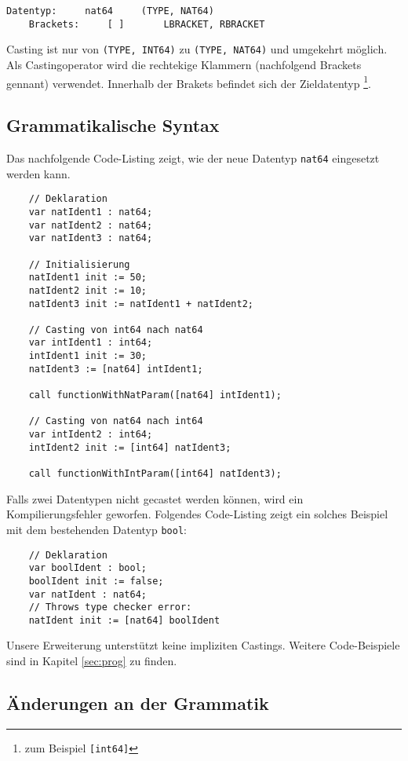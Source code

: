 \documentclass[10pt, a4paper, twocolumn]{article} %
\begin{document}
\begin{lstlisting}[backgroundcolor = \color{lightgray},
xleftmargin = 0.05cm,
framexleftmargin = 0.05em]
    Datentyp:     nat64     (TYPE, NAT64)
    Brackets:     [ ]       LBRACKET, RBRACKET
\end{lstlisting}

Casting ist nur von \texttt{(TYPE, INT64)} zu \texttt{(TYPE, NAT64)} und umgekehrt möglich.
Als Castingoperator wird die rechtekige Klammern (nachfolgend Brackets gennant) verwendet.
Innerhalb der Brakets befindet sich der Zieldatentyp \footnote{zum Beispiel \texttt{[int64]}}.

\subsection{Grammatikalische Syntax}
Das nachfolgende Code-Listing zeigt, wie der neue Datentyp \texttt{nat64} eingesetzt werden kann.
\begin{lstlisting}
    // Deklaration
    var natIdent1 : nat64;
    var natIdent2 : nat64;
    var natIdent3 : nat64;

    // Initialisierung
    natIdent1 init := 50;
    natIdent2 init := 10;
    natIdent3 init := natIdent1 + natIdent2;

    // Casting von int64 nach nat64
    var intIdent1 : int64;
    intIdent1 init := 30;
    natIdent3 := [nat64] intIdent1;

    call functionWithNatParam([nat64] intIdent1);

    // Casting von nat64 nach int64
    var intIdent2 : int64;
    intIdent2 init := [int64] natIdent3;

    call functionWithIntParam([int64] natIdent3);
\end{lstlisting}
Falls zwei Datentypen nicht gecastet werden können, wird ein Kompilierungsfehler geworfen.
Folgendes Code-Listing zeigt ein solches Beispiel mit dem bestehenden Datentyp \texttt{bool}:
\begin{lstlisting}
    // Deklaration
    var boolIdent : bool;
    boolIdent init := false;
    var natIdent : nat64;
    // Throws type checker error:
    natIdent init := [nat64] boolIdent
\end{lstlisting}
Unsere Erweiterung unterstützt keine impliziten Castings.
Weitere Code-Beispiele sind in Kapitel \ref{sec:prog} zu finden.

\subsection{Änderungen an der Grammatik}
\end{document}
